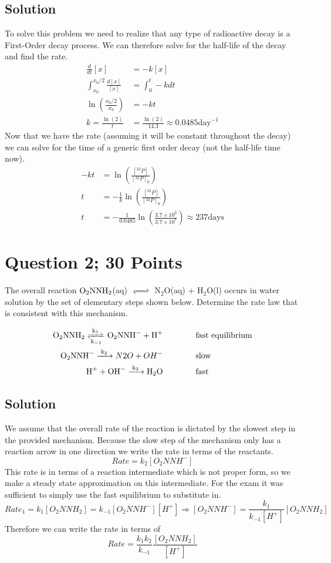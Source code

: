 \documentclass{article}
\newcommand{\be}{\begin{equation}}
\newcommand{\ee}{\end{equation}}
\begin{document}
\subsection*{Solution}
To solve this problem we need to realize that any type of radioactive decay is a First-Order decay process.
We can therefore solve for the half-life of the decay and find the rate. 
\be
\begin{split}
    \frac{d}{dt}[x] &= -k[x]\\
    \int_{x_0}^{x_0/2} \frac{d[x]}{[x]} &= \int_0^t-kdt\\
    \ln\left(\frac{x_0/2}{x_0}\right) &= -kt\\
    k = \frac{\ln(2)}{t} &= \frac{\ln(2)}{14.3} \approx 0.0485 \text{day}^{-1}
\end{split}
\ee
Now that we have the rate (assuming it will be constant throughout the decay) we can solve for the time of a generic first order decay (not the half-life time now). 
\be
\begin{split}
    -kt &= \ln\left(\frac{[^{32}P]}{[^{32}P]_0}\right) \\
    t &= -\frac{1}{k}\ln\left(\frac{[^{32}P]}{[^{32}P]_0}\right)\\
        t &= -\frac{1}{0.0485}\ln\left(\frac{3.7 \times 10^2}{3.7\times 10^7}\right) \approx 237\text{days}
\end{split}
\ee


\newpage

\section*{Question 2; 30 Points}
The overall reaction $\ce{O2NNH2}$(aq) $\ce{<=>}$ N$_2$O(aq) + H$_2$O(l) occurs in water solution by the set of elementary steps shown below. Determine the rate law that is consistent with this mechanism.

\be
\begin{split}
    \ce{O2NNH2 <=>[\ce{k_1}][\ce{k_{-1}}] O2NNH^- + H^+} &\qquad \qquad \text{fast equilibrium}\\
    \ce{O2NNH^- ->[\ce{k_2}]} N2O + OH^- &\qquad \qquad \text{slow}\\
    \ce{H^+ + OH^- ->[\ce{k_3}] H2O} &\qquad \qquad \text{fast}
\end{split}
\ee

\subsection*{Solution}
We assume that the overall rate of the reaction is dictated by the slowest step in the provided mechanism. 
Because the slow step of the mechanism only has a reaction arrow in one direction we write the rate in terms of the reactants. 
\be
Rate = k_2[O_2NNH^-]
\ee
This rate is in terms of a reaction intermediate which is not proper form, so we make a steady state approximation on this intermediate.
For the exam it was sufficient to simply use the fast equilibrium to substitute in. 
\be
Rate_1 = k_1[O_2NNH_2] = k_{-1}[O_2NNH^-][H^+] \Rightarrow [O_2NNH^-] = \frac{k_1}{k_{-1}[H^+]}[O_2NNH_2]
\ee
Therefore we can write the rate in terms of 
\be
Rate = \frac{k_1k_2}{k_{-1}}\frac{[O_2NNH_2]}{[H^+]}
\ee
\end{document}
